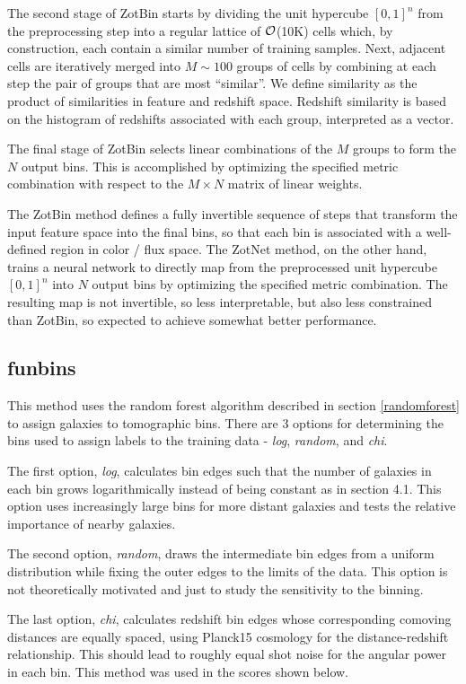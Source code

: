 \documentclass[twocolumn,twocolappendix]{aastex63}
\begin{document}
The second stage of ZotBin starts by dividing the unit hypercube $[0,1]^n$ from the preprocessing step
into a regular lattice of ${\cal O}$(10K) cells which, by construction, each contain a similar number
of training samples.  Next, adjacent cells are iteratively merged into $M \sim 100$ groups of cells by
combining at each step the pair of groups that are most ``similar''.  We define similarity as the product
of similarities in feature and redshift space.  Redshift similarity is based on the histogram of redshifts
associated with each group, interpreted as a vector.

The final stage of ZotBin selects linear combinations of the $M$ groups to form the $N$ output bins. This is
accomplished by optimizing the specified metric combination with respect to the $M\times N$ matrix of linear
weights.

The ZotBin method defines a fully invertible sequence of steps that transform the input feature space into
the final bins, so that each bin is associated with a well-defined region in color / flux space. The ZotNet method,
on the other hand, trains a neural network to directly map from the preprocessed unit hypercube $[0,1]^n$ into
$N$ output bins by optimizing the specified metric combination. The resulting map is not invertible, so less
interpretable, but also less constrained than ZotBin, so expected to achieve somewhat better performance.

\subsection{ {\sc funbins} }
This method uses the random forest algorithm described in section \ref{randomforest} to assign galaxies to tomographic bins. There are 3 options for determining the bins used to assign labels to the training data - \textit{log}, \textit{random}, and \textit{chi}. 

The first option, \textit{log}, calculates bin edges such that the number of galaxies in each bin grows logarithmically instead of being constant as in section 4.1. This option uses increasingly large bins for more distant galaxies and tests the relative importance of nearby galaxies.

The second option, \textit{random}, draws the intermediate bin edges from a uniform distribution while fixing the outer edges to the limits of the data. This option is not theoretically motivated and just to study the sensitivity to the binning. 

The last option, \textit{chi}, calculates redshift bin edges whose corresponding comoving distances are equally spaced, using Planck15 \citep{Planck15} cosmology for the distance-redshift relationship. This should lead to roughly equal shot noise for the angular power in each bin. 
This method was used in the scores shown below.
\end{document}
